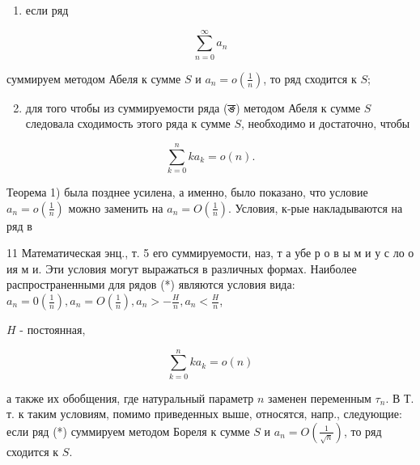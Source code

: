 \documentclass[10pt]{article}
\begin{document}
\begin{enumerate}

  \item если ряд

\end{enumerate}



\[

\sum_{n=0}^{\infty} a_{n}

\]



суммируем методом Абеля к сумме $S$ и $a_{n}=o\left(\frac{1}{n}\right)$, то ряд сходится к $S$;



\begin{enumerate}

  \setcounter{enumi}{1}

  \item для того чтобы из суммируемости ряда (ङ) методом Абеля к сумме $S$ следовала сходимость этого ряда к сумме $S$, необходимо и достаточно, чтобы

\end{enumerate}



\[

\sum_{k=0}^{n} k a_{k}=o(n) .

\]



Теорема 1) была позднее усилена, а именно, было показано, что условие $a_{n}=o\left(\frac{1}{n}\right)$ можно заменить на $a_{n}=O\left(\frac{1}{n}\right)$. Условия, к-рые накладываются на ряд в



11 Математическая энц., т. 5 его суммируемости, наз, т а убе р о в ы м и у с ло о ия м и. Эти условия могут выражаться в различных формах. Наиболее распространенными для рядов (*) являются условия вида: $a_{n}=0\left(\frac{1}{n}\right), a_{n}=O\left(\frac{1}{n}\right), a_{n}>-\frac{H}{n}, a_{n}<\frac{H}{n}$,



$H$ - постоянная,



\[

\sum_{k=0}^{n} k a_{k}=o(n)

\]



а также их обобщения, где натуральный параметр $n$ заменен переменным $\tau_{n}$. В Т. т. к таким условиям, помимо приведенных выше, относятся, напр., следующие: если ряд (*) суммируем методом Бореля к сумме $S$ и $a_{n}=O\left(\frac{1}{\sqrt{n}}\right)$, то ряд сходится к $S$.
\end{document}
